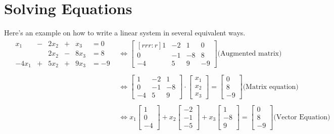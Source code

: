 \documentclass[12pt,letterpaper]{article}
\newcommand{\x}{{\bf x}}
\newcommand{\0}{{\bf 0}}
\theoremstyle{plain}
\theoremstyle{definition}
\begin{document}
\section{Solving Equations}
Here's an example on how to write a linear system in several equivalent ways.
\[\begin{array}{rl}
\begin{array}{lrcrcrl}
&x_1& -&2x_2&+&x_3&=0\\
 &\ & \  &2x_2&-&8x_3&=8\\
&-4x_1& +&5x_2& +&9x_3&=-9
\end{array}

&\Longleftrightarrow
\begin{bmatrix}[rrr:r]
1& -2 & 1 &0\\
0& -1 & -8&8\\
-4 & 5 & 9 &-9
\end{bmatrix} \text{(Augmented matrix)}\\
\ \\
&\Longleftrightarrow
\begin{bmatrix}
1& -2 & 1\\
0& -1 & -8\\
-4 & 5 & 9
\end{bmatrix}\cdot\begin{bmatrix}x_1\\x_2\\x_3\end{bmatrix}=\begin{bmatrix}0\\8\\-9\end{bmatrix}\text{(Matrix equation)}\\
\ \\
&\Longleftrightarrow
x_1\begin{bmatrix}1 \\ 0 \\-4
\end{bmatrix}
+x_2\begin{bmatrix}-2 \\ -1\\-5
\end{bmatrix}
+x_3\begin{bmatrix}1 \\ -8 \\9
\end{bmatrix}=
\begin{bmatrix}0 \\ 8 \\ -9\end{bmatrix}\text{(Vector Equation)}
\end{array}\]
\end{document}
